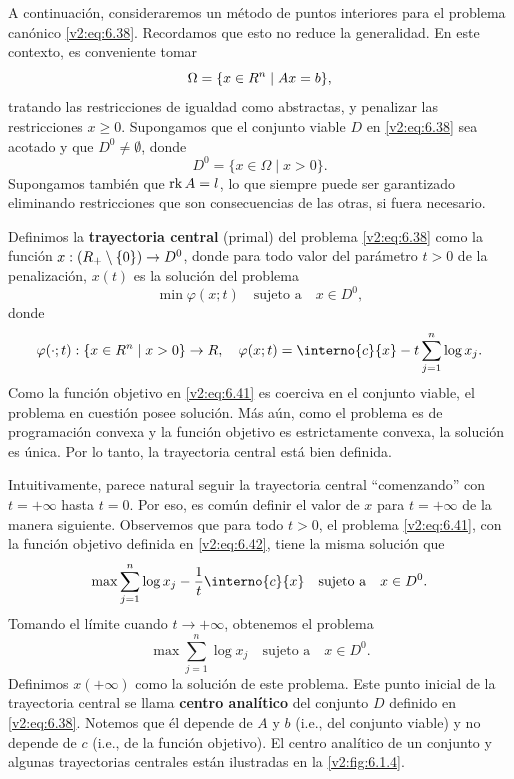 A continuación, consideraremos un método de puntos interiores para el problema canónico \eqref{v2:eq:6.38}. Recordamos que esto no reduce la generalidad. En este contexto, es conveniente tomar
\[
    \Omega = \{ x \in R^n \mid Ax = b \},
\]
tratando las restricciones de igualdad como abstractas, y penalizar las restricciones $x \ge 0$. Supongamos que el conjunto viable $D$ en \eqref{v2:eq:6.38} sea acotado y que $D^0 \neq \emptyset$, donde
\begin{equation}
    D^0 = \{ x \in \Omega \mid x > 0 \}.
    \label{v2:eq:6.40}
\end{equation}
Supongamos también que $\operatorname{rk} A = l$, lo que siempre puede ser garantizado eliminando restricciones que son consecuencias de las otras, si fuera necesario.

Definimos la \textbf{trayectoria central} (primal) del problema \eqref{v2:eq:6.38} como la función $x : (R_+ \setminus \{0\}) \to D^0$, donde para todo valor del parámetro $t > 0$ de la penalización, $x(t)$ es la solución del problema
\begin{equation}
    \min \varphi(x; t) \quad \text{sujeto a} \quad x \in D^0,
    \label{v2:eq:6.41}
\end{equation}
donde
\begin{equation}
    \varphi(\cdot; t) : \{ x \in \Rn \mid x > 0 \} \to \R, \quad \varphi(x; t) = \interno{c}{x} - t \sum_{j=1}^n \log x_j.
    \label{v2:eq:6.42}
\end{equation}
Como la función objetivo en \eqref{v2:eq:6.41} es coerciva en el conjunto viable, el problema en cuestión posee solución. Más aún, como el problema es de programación convexa y la función objetivo es estrictamente convexa, la solución es única. Por lo tanto, la trayectoria central está bien definida.

Intuitivamente, parece natural seguir la trayectoria central ``comenzando'' con $t = +\infty$ hasta $t = 0$. Por eso, es común definir el valor de $x$ para $t = +\infty$ de la manera siguiente. Observemos que para todo $t > 0$, el problema \eqref{v2:eq:6.41}, con la función objetivo definida en \eqref{v2:eq:6.42}, tiene la misma solución que
\[
    \max \sum_{j=1}^n \log x_j - \frac{1}{t} \interno{c}{x} \quad \text{sujeto a} \quad x \in D^0.
\]
Tomando el límite cuando $t \to +\infty$, obtenemos el problema
\[
    \max \sum_{j=1}^n \log x_j \quad \text{sujeto a} \quad x \in D^0.
\]
Definimos $x(+\infty)$ como la solución de este problema. Este punto inicial de la trayectoria central se llama \textbf{centro analítico} del conjunto $D$ definido en \eqref{v2:eq:6.38}. Notemos que él depende de $A$ y $b$ (i.e., del conjunto viable) y no depende de $c$ (i.e., de la función objetivo). El centro analítico de un conjunto y algunas trayectorias centrales están ilustradas en la \cref{v2:fig:6.1.4}.

